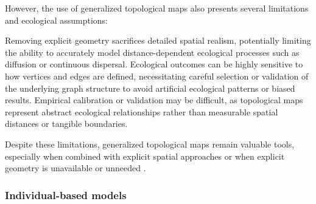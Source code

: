 However, the use of generalized topological maps also presents several limitations and ecological assumptions:
\begin{Itemize}
    \Item{} Removing explicit geometry sacrifices detailed spatial realism, potentially limiting the ability to accurately model distance-dependent ecological processes such as diffusion or continuous dispersal.
    \Item{} Ecological outcomes can be highly sensitive to how vertices and edges are defined, necessitating careful selection or validation of the underlying graph structure to avoid artificial ecological patterns or biased results.
    \Item{} Empirical calibration or validation may be difficult, as topological maps represent abstract ecological relationships rather than measurable spatial distances or tangible boundaries.
\end{Itemize}

Despite these limitations, generalized topological maps remain valuable tools, especially when combined with explicit spatial approaches \cite{Ecormier-Nocca2021} or when explicit geometry is unavailable or unneeded \cite{Duflot2018,Boussange2022}. 





\subsubsection{Individual-based models}

